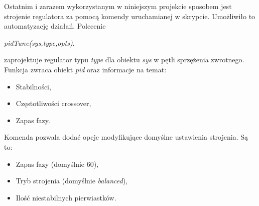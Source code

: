 Ostatnim i zarazem wykorzystanym w niniejszym projekcie sposobem jest strojenie regulatora za pomocą komendy uruchamianej w skrypcie. Umożliwiło to automatyzację działań. Polecenie

\textit{pidTune(sys,type,opts)}.

\noindent zaprojektuje regulator typu \textit{type} dla obiektu \textit{sys} w pętli sprzężenia zwrotnego. Funkcja zwraca  obiekt \textit{pid} oraz informacje na temat:
\begin{itemize}
	\item Stabilności,
	\item Częstotliwości crossover,
	\item Zapas fazy.
\end{itemize}
Komenda pozwala dodać opcje modyfikujące  domyślne ustawienia strojenia. Są to:
\begin{itemize}
	\item Zapas fazy (domyślnie 60),
	\item Tryb strojenia (domyślnie \textit{balanced}),
	\item Ilość niestabilnych pierwiastków.
\end{itemize}